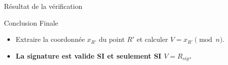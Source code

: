 \begin{frame}{Résultat de la vérification}
\begin{block}{Conclusion Finale}
    \begin{itemize}
        \item Extraire la coordonnée $x_{R'}$ du point $R'$ et calculer $V = x_{R'} \pmod n$.
        \item \textbf{La signature est valide SI et seulement SI $V = R_{sig}$.}
    \end{itemize}
\end{block}
\end{frame}





